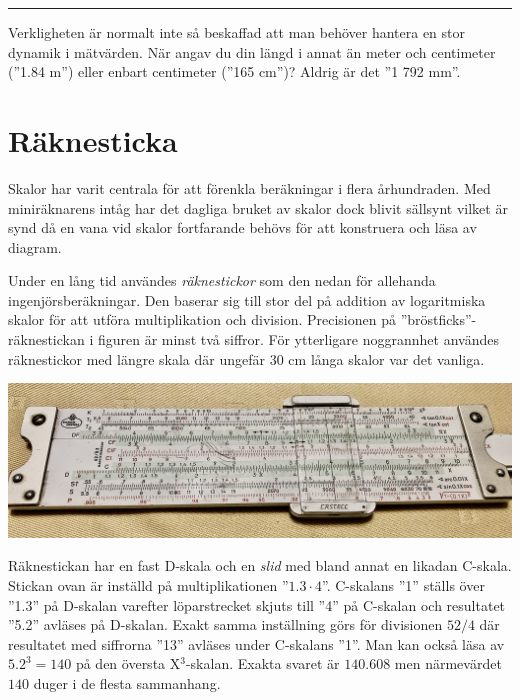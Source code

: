 \documentclass[oneside,11pt,a4paper,swedish]{scrbook}
\newcommand{\slutex}{\begin{flushright} \rule{1ex}{1ex} \end{flushright}}
\begin{document}
\slutex

Verkligheten är normalt inte så beskaffad att man behöver hantera en stor dynamik i mätvärden. När angav du din längd i annat än meter och centimeter (''1.84 m'') eller enbart  centimeter (''165 cm'')? Aldrig är det ''1 792 mm''.





\section{Räknesticka}

Skalor har varit centrala för att förenkla beräkningar i flera århundraden. Med miniräknarens intåg har det dagliga bruket av skalor dock blivit sällsynt vilket är synd då en vana vid skalor fortfarande behövs för att konstruera och läsa av diagram. 

Under en lång tid användes \emph{räknestickor} som den nedan för allehanda ingenjörsberäkningar. Den baserar sig till stor del på addition av logaritmiska skalor för att utföra multiplikation och division. Precisionen  på ''bröstficks''-räknestickan i figuren är minst två siffror. För ytterligare noggrannhet användes räknestickor med längre skala där ungefär 30 cm långa skalor var det vanliga. 




\begin{center}
\includegraphics[scale=0.1]{IMG_1091.jpeg}
\end{center}

Räknestickan har en fast D-skala och en \emph{slid} med bland annat en likadan C-skala. Stickan ovan är inställd på multiplikationen ''$1.3 \cdot 4$''. C-skalans ''1''  ställs över ''1.3'' på D-skalan varefter löparstrecket skjuts till ''4'' på C-skalan och resultatet ''5.2'' avläses på D-skalan. Exakt samma inställning görs för divisionen $52/4$ där resultatet med siffrorna ''13'' avläses under C-skalans ''1''. Man kan också läsa av $5.2^3=140$ på den översta X$^3$-skalan. Exakta svaret är $140.608$ men närmevärdet $140$ duger i de flesta sammanhang. 
\end{document}
